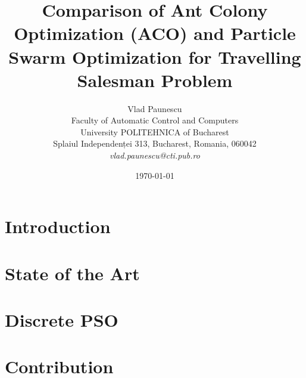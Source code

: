 \documentclass[12pt]{article}
\title{Comparison of Ant Colony Optimization (ACO) and Particle Swarm Optimization for Travelling Salesman Problem}
\author{Vlad Paunescu\\
Faculty of Automatic Control and Computers\\
University POLITEHNICA of Bucharest\\
Splaiul Independenței 313, Bucharest, Romania, 060042 \\
\emph{vlad.paunescu@cti.pub.ro}}
\date{\today}
\begin{document}
\maketitle

\begin{abstract}

\end{abstract}

\section{Introduction}
\label{sec:introduction}


\section{State of the Art}


\section{Discrete PSO}


\section{Contribution}





\end{document}
